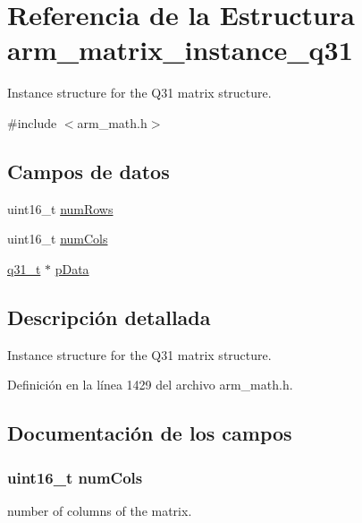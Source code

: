 \hypertarget{structarm__matrix__instance__q31}{}\section{Referencia de la Estructura arm\+\_\+matrix\+\_\+instance\+\_\+q31}
\label{structarm__matrix__instance__q31}


Instance structure for the Q31 matrix structure.  




{\ttfamily \#include $<$arm\+\_\+math.\+h$>$}

\subsection*{Campos de datos}
\begin{DoxyCompactItemize}
\item 
uint16\+\_\+t \hyperlink{structarm__matrix__instance__q31_a1bcf80ccdc2acc29198f1592ae300390}{num\+Rows}
\item 
uint16\+\_\+t \hyperlink{structarm__matrix__instance__q31_a4bb5ec0d13eb4c9cf887aa8366a44117}{num\+Cols}
\item 
\hyperlink{arm__math_8h_adc89a3547f5324b7b3b95adec3806bc0}{q31\+\_\+t} $\ast$ \hyperlink{structarm__matrix__instance__q31_ad296f76577326ff280726323536eed6d}{p\+Data}
\end{DoxyCompactItemize}


\subsection{Descripción detallada}
Instance structure for the Q31 matrix structure. 

Definición en la línea 1429 del archivo arm\+\_\+math.\+h.



\subsection{Documentación de los campos}
\subsubsection[{\texorpdfstring{num\+Cols}{numCols}}]{\setlength{\rightskip}{0pt plus 5cm}uint16\+\_\+t num\+Cols}\hypertarget{structarm__matrix__instance__q31_a4bb5ec0d13eb4c9cf887aa8366a44117}{}\label{structarm__matrix__instance__q31_a4bb5ec0d13eb4c9cf887aa8366a44117}
number of columns of the matrix. 

